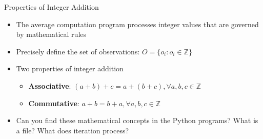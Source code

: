 \documentclass[14pt,aspectratio=169]{beamer}
\begin{document}
%
\begin{frame}{Properties of Integer Addition}
  \vspace*{-.15in}
  \begin{itemize}
    \item The average computation program processes integer values that are
      governed by mathematical rules
      \vspace*{-.15in}
    \item Precisely define the set of observations: $O = \{ o_i : o_i \in
      \mathbb{Z}\}$
      \vspace*{-.15in}
    \item Two properties of integer addition
      \begin{itemize}
        \item {\bf Associative}: $(a + b) + c = a + (b + c), \forall a, b, c \in
          \mathbb{Z}$
        \item {\bf Commutative}: $a + b = b + a, \forall a, b, c \in
          \mathbb{Z}$
      \end{itemize}
      \vspace*{-.2in}
    \item Can you find these mathematical concepts in the Python programs? What
      is a file? What does iteration process?
  \end{itemize}
\end{frame}
\end{document}
